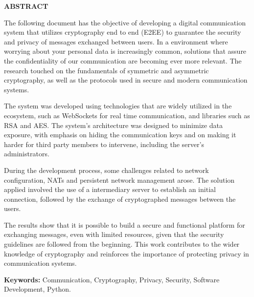 \begin{center}
  \large\textbf{ABSTRACT}
\end{center}

The following document has the objective of developing a digital
communication system that utilizes cryptography end to end (\acs{E2EE}) to
guarantee the security and privacy of messages exchanged between
users. In a environment where worrying about your personal data is
increasingly common, solutions that assure the confidentiality of our
communication are becoming ever more relevant. The research touched
on the fundamentals of symmetric and asymmetric cryptography, as well
as the protocols used in secure and modern communication systems.

The system was developed using technologies that are widely utilized
in the ecosystem, such as WebSockets for real time communication, and
libraries such as \acs{RSA} and \acs{AES}. The system’s architecture
was designed to minimize data exposure, with emphasis on hiding the
communication keys and on making it harder for third party members to
intervene, including the server’s administrators.

During the development process, some challenges related to network
configuration, \acsp{NAT} and persistent network management arose.  The
solution applied involved the use of a intermediary server to
establish an initial connection, followed by the exchange of
cryptographed messages between the users.

The results show that it is possible to build a secure and functional
platform for exchanging messages, even with limited resources, given
that the security guidelines are followed from the beginning. This
work contributes to the wider knowledge of cryptography and
reinforces the importance of protecting privacy in communication systems.

\vspace{0.7cm}

{\setlength{\parindent}{0cm}
  \textbf{Keywords:} Communication, Cryptography, Privacy, Security,
  Software Development, Python.
}

\thispagestyle{empty}
\newpage
